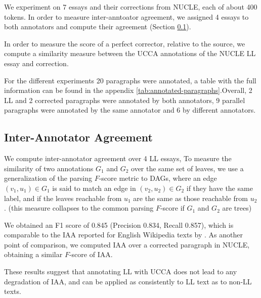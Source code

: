 \documentclass[letter,11pt]{article}
\begin{document}
		We experiment on 7 essays and their corrections from NUCLE, each of about 400 tokens.
		In order to measure inter-anntoator agreement, we assigned 4 essays to both annotators
		and compute their agreement (Section \ref{sec:iaa}).
		
		In order to measure the score
		of a perfect corrector, relative to the source, we compute a similarity measure
		between the UCCA annotations of the NUCLE LL essay and correction.
		
		For the different experiments 20 paragraphs were annotated, a table with the full
		information can be found in the appendix \ref{tab:annotated-paragraphs}.Overall, 2 LL
		and 2 corrected paragraphs were annotated by both annotators, 9 parallel paragraphs were
		annotated by the same annotator and 6 by different annotators.
		
		\subsection{Inter-Annotator Agreement}\label{sec:iaa}
		
		We compute inter-annotator agreement over 4 LL essays, 
		To measure the similarity of two annotations $G_1$ and $G_2$ over the same set of leaves,
		we use a generalization of the parsing $F$-score metric to DAGs, where an
		edge $(v_1,u_1) \in G_1$ is said to match an edge in $(v_2,u_2) \in G_2$ if
		they have the same label, and if the leaves
		reachable from $u_1$ are the same as those reachable from $u_2$. 
		(this measure collapses to the common parsing $F$-score if $G_1$ and $G_2$ are trees)
		
		We obtained an F1 score of 0.845 (Precision 0.834, Recall 0.857), which
		is comparable to the IAA reported for English Wikipedia texts by \cite{abend2013universal}.
		As another point of comparison, we computed IAA over a corrected paragraph in NUCLE,
		obtaining a similar $F$-score of IAA.
		
		These results suggest that annotating LL with UCCA does not lead to any degradation
		of IAA, and can be applied as consistently to LL text as to non-LL texts.
		
		
\end{document}
